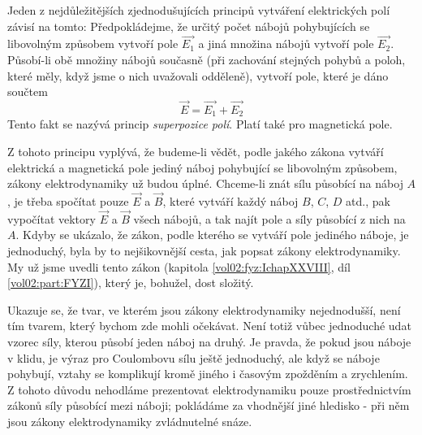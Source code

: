     Jeden z nejdůležitějších zjednodušujících principů vytváření elektrických polí závisí na tomto:
    Předpokládejme, že určitý počet nábojů pohybujících se libovolným způsobem vytvoří pole 
    \(\vec{E_1}\) a jiná množina nábojů vytvoří pole \(\vec{E_2}\). Působí-li obě množiny nábojů 
    současně (při zachování stejných pohybů a poloh, které měly, když jsme o nich uvažovali 
    odděleně), vytvoří pole, které je dáno součtem
    \begin{equation}\label{fyz:eq_fey_elmag03}
      \vec{E} = \vec{E_1} + \vec{E_2}
    \end{equation}
    Tento fakt se nazývá princip \emph{superpozice polí}. Platí také pro magnetická pole.
    
    Z tohoto principu vyplývá, že budeme-li vědět, podle jakého zákona vytváří elektrická a 
    magnetická pole jediný náboj pohybující se libovolným způsobem, zákony elektrodynamiky už budou 
    úplné. Chceme-li znát sílu působící na náboj \(A\), je třeba spočítat pouze \(\vec{E}\) a 
    \(\vec{B}\), které vytváří každý náboj \(B\), \(C\), \(D\) atd., pak vypočítat vektory 
    \(\vec{E}\) a \(\vec{B}\) všech nábojů, a tak najít  pole a síly působící z nich na \(A\). 
    Kdyby se ukázalo, že zákon, podle kterého se vytváří pole jediného náboje, je jednoduchý, byla 
    by to nejšikovnější cesta, jak popsat zákony elektrodynamiky. My už jsme uvedli tento zákon 
    (kapitola \ref{vol02:fyz:IchapXXVIII}, díl \ref{vol02:part:FYZI}), který je, bohužel, dost složitý.
    
    Ukazuje se, že tvar, ve kterém jsou zákony elektrodynamiky nejednodušší, není tím tvarem, který 
    bychom zde mohli očekávat. Není totiž vůbec jednoduché udat vzorec síly, kterou působí jeden 
    náboj na druhý. Je pravda, že pokud jsou náboje v klidu, je výraz pro Coulombovu sílu ještě 
    jednoduchý, ale když se náboje pohybují, vztahy se komplikují kromě jiného i časovým zpožděním 
    a zrychlením. Z tohoto důvodu nehodláme prezentovat elektrodynamiku pouze prostřednictvím 
    zákonů síly působící mezi náboji; pokládáme za vhodnější jiné hledisko - při něm jsou zákony 
    elektrodynamiky zvládnutelné snáze.
    
